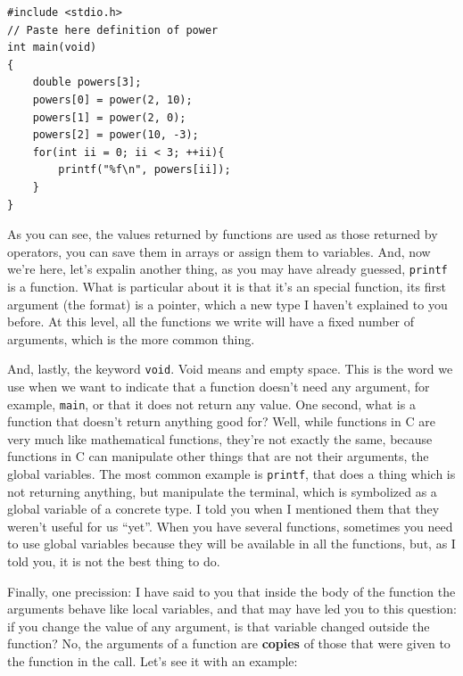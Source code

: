 \documentclass[a4paper]{article}
\begin{document}
\noindent
\begin{minipage}[H]{\linewidth}
\mbox{}
\begin{lstlisting}[style=C, label={lst:functionInvocation},
caption={Invocación de función en C}]
#include <stdio.h>
// Paste here definition of power
int main(void)
{
    double powers[3];
    powers[0] = power(2, 10);
    powers[1] = power(2, 0);
    powers[2] = power(10, -3);
    for(int ii = 0; ii < 3; ++ii){
        printf("%f\n", powers[ii]);
    }
}
\end{lstlisting}
\end{minipage}

As you can see, the values returned by functions are used as those returned by
operators, you can save them in arrays or assign them to variables. And, now
we're here, let's expalin another thing, as you may have already guessed,
\verb!printf! is a function. What is particular about it is that it's an special
function, its first argument (the format) is a pointer, which a new type I
haven't explained to you before. At this level, all the functions we write will
have a fixed number of arguments, which is the more common thing.

And, lastly, the keyword \lstinline[style=C]{void}. Void means and empty space.
This is the word we use when we want to indicate that a function doesn't need
any argument, for example, \verb!main!, or that it does not return any value.
One second, what is a function that doesn't return anything good for? Well,
while functions in C are very much like mathematical functions, they're not
exactly the same, because functions in C can manipulate other things that are
not their arguments, the global variables. The most common example is
\verb!printf!, that does a thing which is not returning anything, but
manipulate the terminal, which is symbolized as a global variable of a concrete
type. I told you when I mentioned them that they weren't useful for us ``yet''.
When you have several functions, sometimes you need to use global variables
because they will be available in all the functions, but, as I told you, it is
not the best thing to do.

Finally, one precission: I have said to you that inside the body of the function
the arguments behave like local variables, and that may have led you to this
question: if you change the value of any argument, is that variable changed
outside the function? No, the arguments of a function are \textbf{copies} of
those that were given to the function in the call.
Let's see it with an example:
\end{document}
